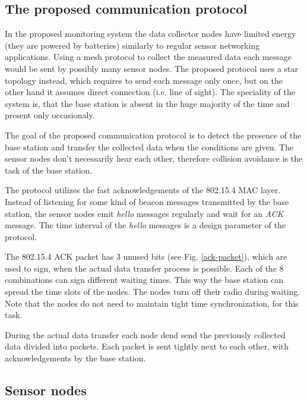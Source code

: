 \documentclass[conference]{IEEEtran}
\begin{document}
\subsection{The proposed communication protocol}

In the proposed monitoring system the data collector nodes have limited
energy (they are powered by batteries) similarly to regular sensor networking
applications. Using a mesh protocol to collect the measured data each message
would be sent by possibly many sensor nodes. The proposed protocol uses a star
topology instead, which requires to send each message only once, but on the
other hand it assumes direct connection (i.e. line of sight).
The speciality of the system is, that the base station is absent in the huge
majority of the time and present only occasionaly.

The goal of the proposed communication protocol is to detect the presence
of the base station and transfer the collected data when the conditions are
given. The sensor nodes don't necessarily hear each other, therefore collision
avoidance is the task of the base station.

The protocol utilizes the fast acknowledgements of the 802.15.4 MAC layer.
Instead of listening for some kind of beacon messages transmitted by the
base station, the sensor nodes emit \emph{hello} messages
regularly and wait for an \emph{ACK} message.
The time interval of the \emph{hello} messages is a design parameter of
the protocol.

The 802.15.4 ACK packet has 3 unused bits (see Fig. \ref{ack-packet}), which
are used to sign, when the actual data transfer process is possible.
Each of the 8 combinations can sign different waiting times. This way
the base station can spread the time slots of the nodes. The nodes turn off
their radio during waiting. Note that the nodes do not need to maintain tight
time synchronization, for this task.

During the actual data transfer each node dend send the
previously collected data divided into packets. Each packet is sent
tightly next to each other, with acknowledgements by the base station.





\subsection{Sensor nodes}
\end{document}
